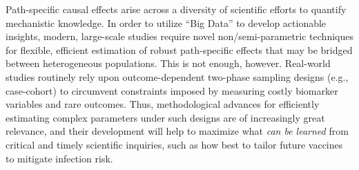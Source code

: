 Path-specific causal effects arise across a diversity of scientific efforts to
quantify mechanistic knowledge. In order to utilize ``Big Data'' to develop
actionable insights, modern, large-scale studies require novel
non/semi-parametric techniques for flexible, efficient estimation of robust
path-specific effects that may be bridged between heterogeneous populations.
This is not enough, however. Real-world studies routinely rely upon
outcome-dependent two-phase sampling designs (e.g., case-cohort) to circumvent
constraints imposed by measuring costly biomarker variables and rare outcomes.
Thus, methodological advances for efficiently estimating complex parameters
under such designs are of increasingly great relevance, and their development
will help to maximize what \textit{can be learned} from critical and timely
scientific inquiries, such as how best to tailor future vaccines to mitigate
infection risk.
